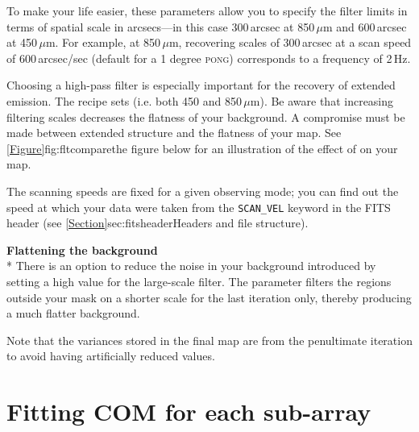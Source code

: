 \documentclass[11pt,oneside,chapters]{starlink}
\begin{document}
To make your life easier, these parameters allow you to specify the
filter limits in terms of spatial scale in arcsecs---in this case
300\,arcsec at 850\,$\mu$m and 600\,arcsec at 450\,$\mu$m. For example,
at 850\,$\mu$m, recovering scales of 300\,arcsec at a scan speed of
600\,arcsec/sec (default for a 1 degree \textsc{pong}) corresponds to
a frequency of 2\,Hz.

Choosing a high-pass filter is especially important for the recovery
of extended emission. The 
recipe sets  (i.e. both 450
and 850\,$\mu$m). Be aware that increasing filtering scales decreases
the flatness of your background. A compromise must be made between
extended structure and the flatness of your map. See
\cref{Figure}{fig:fltcompare}{the figure below} for an illustration of
the effect of  on your map.

The scanning speeds are fixed for a given observing mode; you can find
out the speed at which your data were taken from the
\texttt{SCAN\_VEL} keyword in the FITS header (see
\cref{Section}{sec:fitsheader}{Headers and file structure}).

\textbf{Flattening the background}\\*
There is an option to reduce the noise in your background introduced by
setting a high value for the large-scale filter. The parameter
 filters the regions outside
your  mask on a shorter scale for the last iteration only,
thereby producing a much flatter background.

Note that the variances stored in the final map are from the penultimate
iteration to avoid having artificially reduced values.




\section{Fitting COM for each sub-array}
\label{sec:fitcom}
\end{document}
